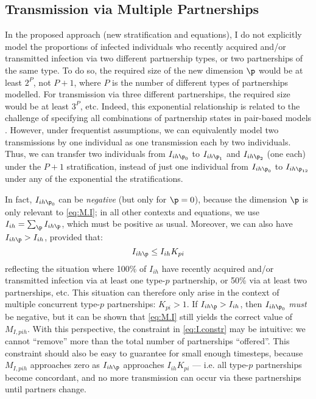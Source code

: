 \subsection{Transmission via Multiple Partnerships}\label{foi.prop.mp}
In the proposed approach (\ie new stratification and equations),
I do not explicitly model the proportions of infected individuals
who recently acquired and/or transmitted infection via two different partnership types,
or two partnerships of the same type.
To do so, the required size of the new dimension $\p$ would be at least $2^{P}$, not $P+1$,
where $P$ is the number of different types of partnerships modelled.
For transmission via three different partnerships, the required size would be at least $3^P$, etc.
Indeed, this exponential relationship is related to the challenge of
specifying all combinations of partnership states in pair-based models \cite{Kretzschmar2017}.
However, under frequentist assumptions, we can equivalently model
two transmissions by one individual as one transmission each by two individuals.
Thus, we can transfer two individuals from $I_{ih\p_0}$ to
$I_{ih\p_1}$ and $I_{ih\p_2}$ (one each) under the $P+1$ stratification,
instead of just one individual from $I_{ih\p_0}$ to
$I_{ih\p_{12}}$ under any of the exponential the stratifications.
\par
In fact, $I_{ih\p_0}$ can be \emph{negative} (but only for $\p = 0$),
because the dimension $\p$ is only relevant to \eqref{eq:M.I};
in all other contexts and equations,
we use $I_{ih} = \sum_{\p} I_{ih\p}$, which must be positive as usual.
Moreover, we can also have $I_{ih\p} > I_{ih}$, provided that:
\begin{equation}\label{eq:I.constr}
  I_{ih\p} \le I_{ih} K_{pi}
\end{equation}
reflecting the situation where 100\% of $I_{ih}$
have recently acquired and/or transmitted infection via at least one type-$p$ partnership,
or 50\% via at least two partnerships, etc.
This situation can therefore only arise in the context of
multiple concurrent type-$p$ partnerships: $K_{pi} > 1$.
If $I_{ih\p} > I_{ih}$, then $I_{ih\p_0}$ \emph{must} be negative,
but it can be shown that \eqref{eq:M.I} still yields the correct value of $M_{I,pih}$.
With this perspective, the constraint in \eqref{eq:I.constr} may be intuitive:
we cannot ``remove'' more than the total number of partnerships ``offered''.
This constraint should also be easy to guarantee for small enough timesteps,
because $M_{I,pih}$ approaches zero as $I_{ih\p}$ approaches $I_{ih} K_{pi}$
--- i.e. all type-$p$ partnerships become concordant,
and no more transmission can occur via these partnerships until partners change.

